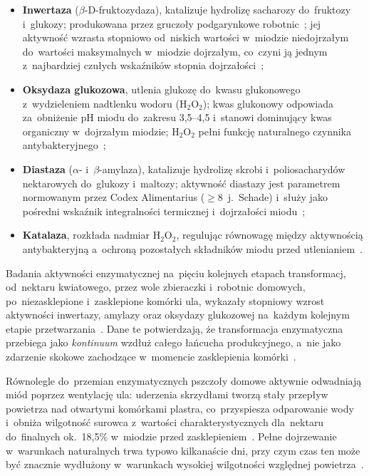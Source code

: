\begin{itemize}
    \item \textbf{Inwertaza} ($\beta$-D-fruktozydaza), katalizuje
          hydrolizę sacharozy do~fruktozy i~glukozy; produkowana przez
          gruczoły podgarynkowe robotnic~\cite{biochemreactions2022};
          jej aktywność wzrasta stopniowo od~niskich wartości
          w~miodzie niedojrzałym do~wartości maksymalnych w~miodzie
          dojrzałym, co~czyni ją jednym z~najbardziej czułych
          wskaźników stopnia dojrzałości~\cite{zhang2021};
    \item \textbf{Oksydaza glukozowa}, utlenia glukozę do~kwasu
          glukonowego z~wydzieleniem nadtlenku wodoru (H$_2$O$_2$);
          kwas glukonowy odpowiada za~obniżenie pH miodu do~zakresu
          3{,}5--4{,}5 i~stanowi dominujący kwas organiczny
          w~dojrzałym miodzie; H$_2$O$_2$ pełni funkcję naturalnego
          czynnika antybakteryjnego~\cite{biochemreactions2022,zhang2021};
    \item \textbf{Diastaza} ($\alpha$- i~$\beta$-amylaza), katalizuje
          hydrolizę skrobi i~poliosacharydów nektarowych do~glukozy
          i~maltozy; aktywność diastazy jest parametrem normowanym
          przez Codex Alimentarius ($\geq 8$~j.~Schade) i~służy jako
          pośredni wskaźnik integralności termicznej i~dojrzałości
          miodu~\cite{codex_stan12,biochemreactions2022,zhang2021};
    \item \textbf{Katalaza}, rozkłada nadmiar H$_2$O$_2$, regulując
          równowagę między aktywnością antybakteryjną
          a~ochroną pozostałych składników miodu przed
          utlenianiem~\cite{biochemreactions2022}.
\end{itemize}

Badania aktywności enzymatycznej na~pięciu kolejnych etapach
transformacj, od~nektaru kwiatowego, przez wole zbieraczki
i~robotnic domowych, po~niezasklepione i~zasklepione komórki ula,  wykazały stopniowy wzrost aktywności inwertazy, amylazy oraz oksydazy glukozowej na~każdym kolejnym etapie
przetwarzania~\cite{enzymesrole2023}. Dane te potwierdzają,
że transformacja enzymatyczna przebiega jako \emph{kontinuum}
wzdłuż całego łańcucha produkcyjnego, a~nie jako zdarzenie
skokowe zachodzące w~momencie zasklepienia
komórki~\cite{enzymesrole2023,zhang2021}.

Równolegle do~przemian enzymatycznych pszczoły domowe aktywnie
odwadniają miód poprzez wentylację ula: uderzenia skrzydłami tworzą
stały przepływ powietrza nad otwartymi komórkami plastra, co~przyspiesza
odparowanie wody i~obniża wilgotność surowca z~wartości
charakterystycznych dla~nektaru do~finalnych ok.~18,5\%
w~miodzie przed zasklepieniem~\cite{zhang2021}. Pełne dojrzewanie
w~warunkach naturalnych trwa typowo kilkanaście dni,
przy czym czas ten może być znacznie wydłużony w~warunkach
wysokiej wilgotności względnej powietrza~\cite{zhang2021,tadele2025}.


